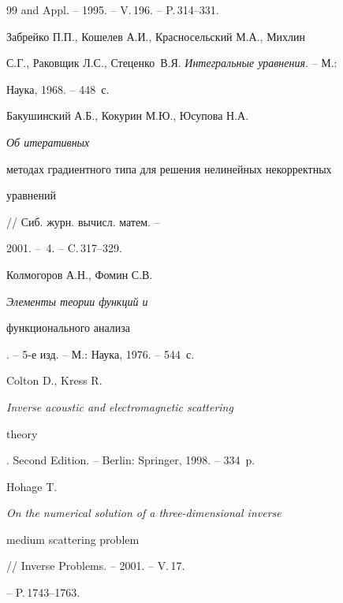 \begin{thebibliography}{99}
and Appl. -- 1995. -- V.\,196. -- P.\,314--331.




Забрейко П.П., Кошелев А.И., Красносельский М.А., Михлин 


С.Г., Раковщик Л.С., Сте\-цен\-ко~В.Я. {\em Интегральные уравнения}. -- М.:


Наука, 1968. -- 448~с.




Бакушинский А.Б., Кокурин М.Ю., Юсупова Н.А. {\em Об итеративных 


методах градиентного типа для решения нелинейных некорректных 


уравнений} // Сиб. журн. вычисл. матем. --


2001. -- \No\,4. -- C.\,317--329.




Колмогоров А.Н., Фомин С.В. {\em Элементы теории функций и 


функционального анализа}. -- 5-е изд. -- М.: Наука, 1976. -- 544~с.




Colton D., Kress R. {\em Inverse acoustic and electromagnetic scattering 


theory}. Second Edition. -- Berlin: Springer, 1998. -- 334~p.




Hohage T. {\em On the numerical solution of a three-dimensional inverse 


medium scattering problem} // Inverse Problems. -- 2001. -- V.\,17.


-- P.\,1743--1763.





\end{thebibliography}





\vskip 2cm












\label{end}






